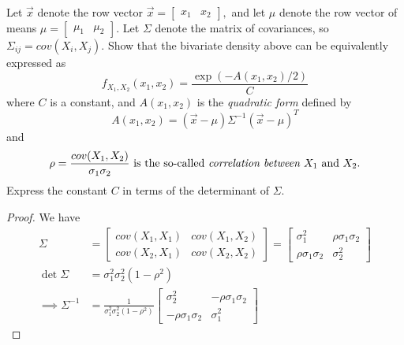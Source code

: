 \documentclass{article}
\begin{document}
\begin{enumerate}
	\begin{enumerate}
			\ii Let $\vec{x}$ denote the row vector $\vec{x}=\begin{bmatrix}
				x_1 & x_2
			\end{bmatrix},$ and let $\mu$ denote the row vector of means $\mu=\begin{bmatrix}
				\mu_1 & \mu_2
			\end{bmatrix}.$ Let $\Sigma$ denote the matrix of covariances, so $\Sigma_{ij}=cov(X_i, X_j).$ Show that the bivariate density above can be equivalently expressed as \[f_{X_1, X_2}(x_1, x_2) = \frac{\exp{(-A(x_1, x_2)/2)}}{C}\] where $C$ is a constant, and $A(x_1, x_2)$ is the \textit{quadratic form} defined by \[A(x_1, x_2)=(\vec{x}-\mu)\Sigma^{-1}(\vec{x}-\mu)^{T}\] and \[\rho=\frac{cov(X_1, X_2)}{\sigma_1\sigma_2} \text { is the so-called \it{correlation} between } X_1 \text{ and } X_2. \] Express the constant $C$ in terms of the determinant of $\Sigma.$
				\begin{proof}
					We have
					\begin{align*}
						\Sigma&=\begin{bmatrix}
							cov(X_1, X_1) & cov(X_1, X_2) \\
							cov(X_2, X_1) & cov(X_2, X_2)
						\end{bmatrix} = \begin{bmatrix}
							\sigma_1^2 & \rho\sigma_1\sigma_2 \\
							\rho\sigma_1\sigma_2 & \sigma_2^2
						\end{bmatrix} \\
						\det{\Sigma} &= \sigma_1^2\sigma_2^2(1-\rho^2) \\
						\implies \Sigma^{-1} &= \frac{1}{\sigma_1^2\sigma_2^2(1-\rho^2)}\begin{bmatrix}
							\sigma_2^2 & -\rho\sigma_1\sigma_2 \\
							-\rho\sigma_1\sigma_2 & \sigma_1^2
						\end{bmatrix}
					\end{align*}


\end{proof}
\end{enumerate}
\end{enumerate}
\end{document}
